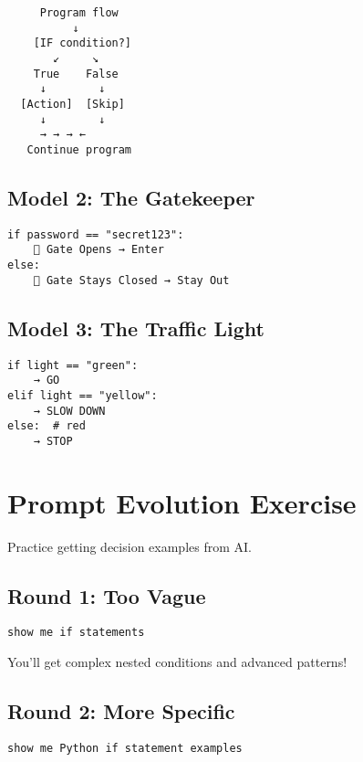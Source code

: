 \documentclass[
  letterpaper,
  DIV=11,
  numbers=noendperiod,
  oneside]{scrreprt}
\begin{document}
\begin{verbatim}
     Program flow
          ↓
    [IF condition?]
       ↙     ↘
    True    False
     ↓        ↓
  [Action]  [Skip]
     ↓        ↓
     → → → ←
   Continue program
\end{verbatim}

\subsection{Model 2: The Gatekeeper}\label{model-2-the-gatekeeper}

\begin{verbatim}
if password == "secret123":
    🚪 Gate Opens → Enter
else:
    🚫 Gate Stays Closed → Stay Out
\end{verbatim}

\subsection{Model 3: The Traffic Light}\label{model-3-the-traffic-light}

\begin{verbatim}
if light == "green":
    → GO
elif light == "yellow":  
    → SLOW DOWN
else:  # red
    → STOP
\end{verbatim}

\section{Prompt Evolution Exercise}\label{prompt-evolution-exercise-3}

Practice getting decision examples from AI.

\subsection{Round 1: Too Vague}\label{round-1-too-vague-3}

\begin{verbatim}
show me if statements
\end{verbatim}

You'll get complex nested conditions and advanced patterns!

\subsection{Round 2: More Specific}\label{round-2-more-specific-2}

\begin{verbatim}
show me Python if statement examples
\end{verbatim}
\end{document}
